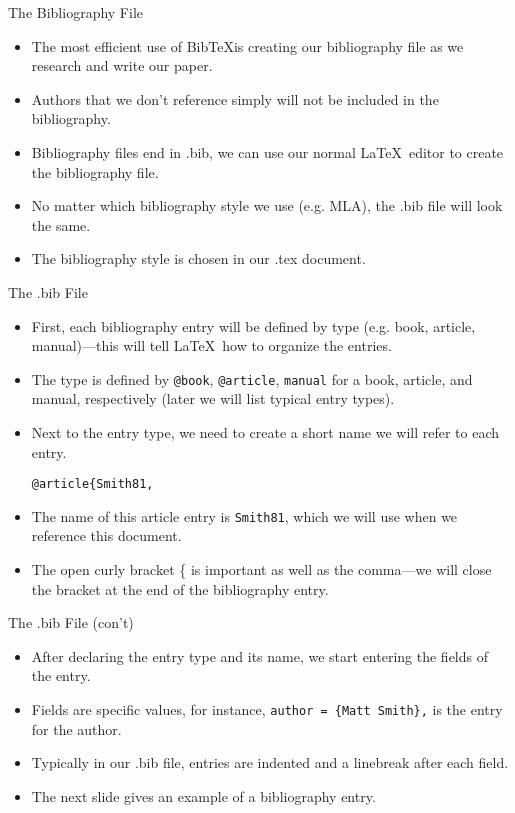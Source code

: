 \documentclass[pdf]{prosper}
\begin{document}
\begin{slide}{The Bibliography File}
	\begin{itemize}
		\item The most efficient use of Bib\TeX is creating our bibliography file as we research and write our paper.
		\item Authors that we don't reference simply will not be included in the bibliography.
		\item Bibliography files end in .bib, we can use our normal \LaTeX\ editor to create the bibliography file.
		\item No matter which bibliography style we use (e.g. MLA), the .bib file will look the same.
		\item The bibliography style is chosen in our .tex document.
	\end{itemize}
\end{slide}
\begin{slide}{The .bib File}
	\begin{itemize}
		\item First, each bibliography entry will be defined by type (e.g. book, article, manual)---this will tell \LaTeX\ how to organize the entries.
		\item The type is defined by \texttt{@book}, \texttt{@article}, \texttt{manual} for a book, article, and manual, respectively (later we will list typical entry types).
		\item Next to the entry type, we need to create a short name we will refer to each entry.
			\begin{center}
				\texttt{@article\{Smith81,}
			\end{center}
		\item The name of this article entry is \texttt{Smith81}, which we will use when we reference this document.
		\item The open curly bracket \{ is important as well as the comma---we will close the bracket at the end of the bibliography entry.
	\end{itemize}
\end{slide}
\begin{slide}{The .bib File (con't)}
	\begin{itemize}
		\item After declaring the entry type and its name, we start entering the fields of the entry.
		\item Fields are specific values, for instance, \texttt{author = \{Matt Smith\},} is the entry for the author.
		\item Typically in our .bib file, entries are indented and a linebreak after each field.
		\item The next slide gives an example of a bibliography entry.
	\end{itemize}
\end{slide}
\end{document}
